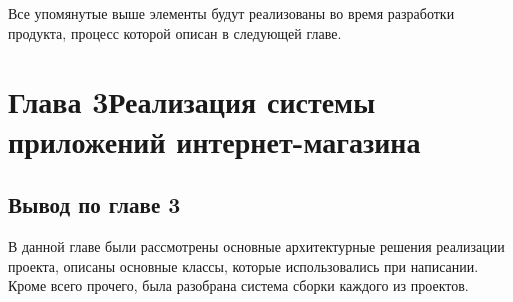 \documentclass[14pt,a4paper]{scrartcl}
\begin{document}
    Все упомянутые выше элементы будут реализованы во время разработки продукта, процесс которой описан в следующей главе.

    \section[Глава 3 Реализация системы приложений интернет-магазина]{Глава 3\break Реализация системы приложений интернет-магазина}
    \label{sec:charpter-3-inplementation}

    
    
    

    \subsection{Вывод по главе 3}\label{subsec:3-conclusion}\indent

    В данной главе были рассмотрены основные архитектурные решения реализации проекта, описаны основные классы, которые использовались при написании.
    Кроме всего прочего, была разобрана система сборки каждого из проектов.

    

    
\end{document}
